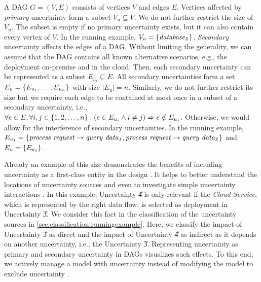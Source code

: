 A \ac{DAG} $G = (V, E)$ consists of vertices $V$ and edges $E$.
Vertices affected by \emph{primary} uncertainty form a subset $V_{u} \subseteq V$.
We do not further restrict the size of $V_{u}$. 
The subset is empty if no primary uncertainty exists, but it can also contain every vertex of $V$.
In the running example, $V_{u} = \{ \mathit{database_{2}} \}$.
\emph{Secondary} uncertainty affects the edges of a \ac{DAG}.
Without limiting the generality, we can assume that the \ac{DAG} contains all known alternative scenarios, e.g., the deployment on-premise and in the cloud.
Then, each secondary uncertainty can be represented as a subset $E_{u_{i}} \subseteq E$.
All secondary uncertainties form a set $E_{u} = \{ E_{u_{1}}, \dots, E_{u_{n}} \}$ with size $\lvert E_{u} \rvert = n$.
Similarly, we do not further restrict its size but we require each edge to be contained at most once in a subset of a secondary uncertainty, i.e., $\forall e \in E, \forall i,j \in \{ 1, 2, \dots, n \} : (e \in E_{u_{i}} \wedge i \neq j) \Rightarrow e \notin E_{u_{j}}$.
Otherwise, we would allow for the interference of secondary uncertainties.
In the running example, $E_{u_{1}} = \{ \mathit{process~request} \rightarrow \mathit{query~data_{1}}, \mathit{process~request} \rightarrow \mathit{query~data_{2}} \}$ and $E_{u} = \{ E_{u_{1}} \}$.

Already an example of this size demonstrates the benefits of including uncertainty as a first-class entity in the design \cite{garlan_software_2010}.
It helps to better understand the locations of uncertainty sources and even to investigate simple uncertainty interactions \cite{camara_uncertainty_2024}.
In this example, Uncertainty \U{4} is only relevant if the \emph{Cloud Service}, which is represented by the right data flow, is selected as deployment in Uncertainty \U{3}.
We consider this fact in the classification of the uncertainty sources in \autoref{sec:classification:runningexample}.
Here, we classify the impact of Uncertainty \U{3} as direct and the impact of Uncertainty \U{4} as indirect as it depends on another uncertainty, i.e., the Uncertainty \U{3}.
Representing uncertainty as primary and secondary uncertainty in \acp{DAG} visualizes such effects.
To this end, we actively manage a model with uncertainty instead of modifying the model to exclude uncertainty \cite{perez-palacin_dealing_2014}.






